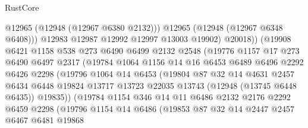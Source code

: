 \begin{lexlean}{RustCore}
\begin{coremodule}
                            @12965
                            (@12948 (@12967 @6380 @2132)))
                          @12965
                          (@12948 (@12967 @6348 @6408)))
                        @12983
                        @12987
                        @12992
                        @12997
                        @13003
                        @19902)
                      @20018))
                  (@19908
                    @6421
                    @1158
                    @538
                    @273
                    @6490
                    @6499
                    @2132
                    @2548
                    (@19776
                      @1157
                      @17
                      @273
                      @6490
                      @6497
                      @2317
                      (@19784
                        @1064
                        @1156
                        @14
                        @16
                        @6453
                        @6489
                        @6496
                        @2292
                        @6426
                        @2298
                        (@19796
                          @1064
                          @14
                          @6453
                          (@19804
                            @87
                            @32
                            @14
                            @4631
                            @2457
                            @6434
                            @6448
                            @19824
                            @13717
                            @13723
                            @22035
                            @13743
                            (@12948 (@13745 @6448 @6435))
                            @19835))
                        (@19784
                          @1154
                          @346
                          @14
                          @11
                          @6486
                          @2132
                          @2176
                          @2292
                          @6459
                          @2298
                          (@19796
                            @1154
                            @14
                            @6486
                            (@19853
                              @87
                              @32
                              @14
                              @2447
                              @2457
                              @6467
                              @6481
                              @19868

\end{coremodule}
\end{lexlean}
